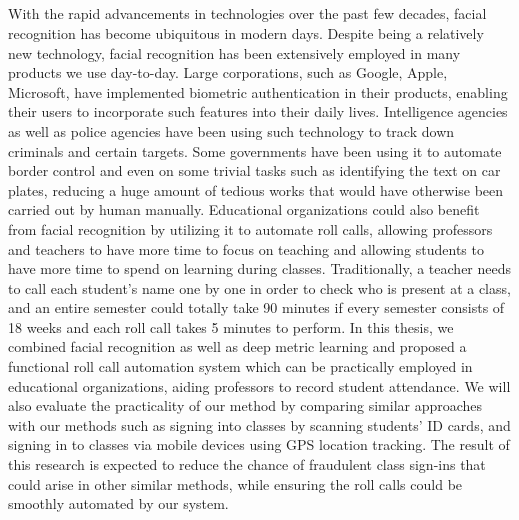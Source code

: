 \begin{center}
  \section*{\abstractname}
\end{center}
\large

With the rapid advancements in technologies over the past few decades, facial recognition has become
ubiquitous in modern days. Despite being a relatively new technology, facial recognition has been
extensively employed in many products we use day-to-day. Large corporations, such as Google, Apple, Microsoft, 
have implemented biometric authentication in their products, enabling their users to incorporate
such features into their daily lives. Intelligence agencies as well as police agencies have been using
such technology to track down criminals and certain targets. Some governments have been using it to automate
border control and even on some trivial tasks such as identifying the text on car plates, reducing a huge amount
of tedious works that would have otherwise been carried out by human manually. Educational organizations
could also benefit from facial recognition by utilizing it to automate roll calls, allowing professors and teachers
to have more time to focus on teaching and allowing students to have more time to spend on learning during classes.
Traditionally, a teacher needs to call each student's name one by one in order to check who is present at a class,
and an entire semester could totally take 90 minutes if every semester consists of 18 weeks and each roll call takes
5 minutes to perform. In this thesis, we combined facial recognition as well as deep metric learning and proposed
a functional roll call automation system which can be practically employed in educational organizations, 
aiding professors to record student attendance. We will also evaluate the practicality of our method by comparing
similar approaches with our methods such as signing into classes by scanning students' ID cards, and
signing in to classes via mobile devices using GPS location tracking. The result of this research is expected to
reduce the chance of fraudulent class sign-ins that could arise in other similar methods, while ensuring the roll calls
could be smoothly automated by our system.
\newpage
